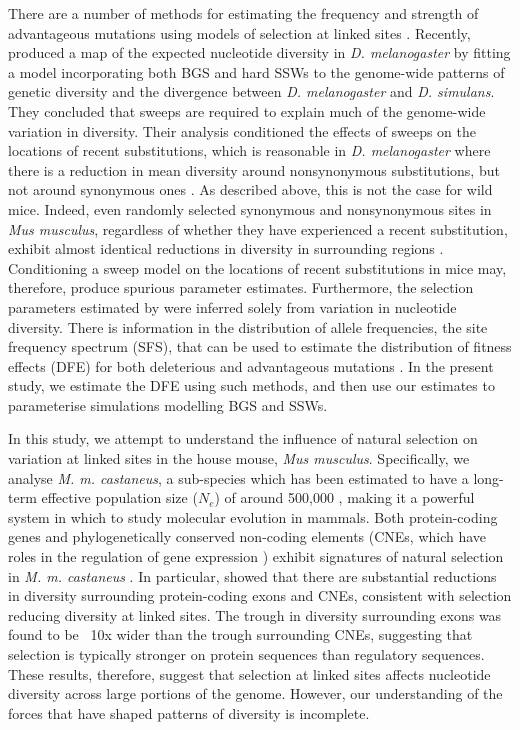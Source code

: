 	There are a number of methods for estimating the frequency and strength of advantageous mutations using models of selection at linked sites \citep{RN352}. Recently, \cite{RN274} produced a map of the expected nucleotide diversity in \textit{D. melanogaster} by fitting a model incorporating both BGS and hard SSWs to the genome-wide patterns of genetic diversity and the divergence between \textit{D. melanogaster} and \textit{D. simulans}. They concluded that sweeps are required to explain much of the genome-wide variation in diversity. Their analysis conditioned the effects of sweeps on the locations of recent substitutions, which is reasonable in \textit{D. melanogaster} where there is a reduction in mean diversity around nonsynonymous substitutions, but not around synonymous ones \citep{RN274}. As described above, this is not the case for wild mice. Indeed, even randomly selected synonymous and nonsynonymous sites in \textit{Mus musculus}, regardless of whether they have experienced a recent substitution, exhibit almost identical reductions in diversity in surrounding regions \cite{RN122}. Conditioning a sweep model on the locations of recent substitutions in mice may, therefore, produce spurious parameter estimates. Furthermore, the selection parameters estimated by \cite{RN122} were inferred solely from variation in nucleotide diversity. There is information in the distribution of allele frequencies, the site frequency spectrum (SFS), that can be used to estimate the distribution of fitness effects (DFE) for both deleterious and advantageous mutations \citep{RN164, RN201, RN210, RN354}. In the present study, we estimate the DFE using such methods, and then use our estimates to parameterise simulations modelling BGS and SSWs.

	In this study, we attempt to understand the influence of natural selection on variation at linked sites in the house mouse, \textit{Mus musculus}. Specifically, we analyse \textit{M. m. castaneus}, a sub-species which has been estimated to have a long-term effective population size ($N_e$) of around 500,000 \citep{RN233, RN158}, making it a powerful system in which to study molecular evolution in mammals. Both protein-coding genes and phylogenetically conserved non-coding elements (CNEs, which have roles in the regulation of gene expression \citep{RN353}) exhibit signatures of natural selection in \textit{M. m. castaneus} \citep{RN122}. In particular, \cite{RN122} showed that there are substantial reductions in diversity surrounding protein-coding exons and CNEs, consistent with selection reducing diversity at linked sites. The trough in diversity surrounding exons was found to be ~10x wider than the trough surrounding CNEs, suggesting that selection is typically stronger on protein sequences than regulatory sequences. These results, therefore, suggest that selection at linked sites affects nucleotide diversity across large portions of the genome. However, our understanding of the forces that have shaped patterns of diversity is incomplete.

